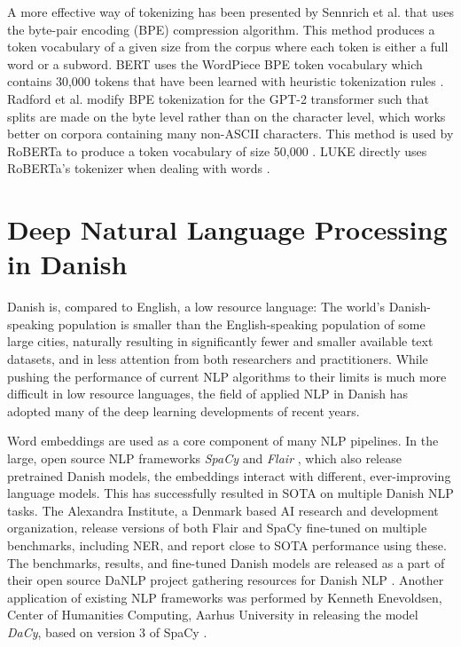 \documentclass[main.tex]{subfiles}
\begin{document}
A more effective way of tokenizing has been presented by Sennrich et al. \cite{sennrich-etal-2016-neural} that uses the byte-pair encoding (BPE) compression algorithm.
This method produces a token vocabulary of a given size from the corpus where each token is either a full word or a subword.
BERT uses the WordPiece BPE token vocabulary which contains 30,000 tokens that have been learned with heuristic tokenization rules \cite{wu2016tokenize, devlin2019bert}.
Radford et al. \cite{Radford2019gpt2} modify BPE tokenization for the GPT-2 transformer such that splits are made on the byte level rather than on the character level, which works better on corpora containing many non-ASCII characters.
This method is used by RoBERTa to produce a token vocabulary of size 50,000 \cite{liu2019roberta}.
LUKE directly uses RoBERTa's tokenizer when dealing with words \cite{yamada2020luke}.

\section{Deep Natural Language Processing in Danish}
\label{sec:nlpda}
Danish is, compared to English, a low resource language:
The world's Danish-speaking population is smaller than the English-speaking population of some large cities, naturally resulting in significantly fewer and smaller available text datasets, and in less attention from both researchers and practitioners.
While pushing the performance of current NLP algorithms to their limits is much more difficult in low resource languages, the field of applied NLP in Danish has adopted many of the deep learning developments of recent years.

Word embeddings are used as a core component of many NLP pipelines.
In the large, open source NLP frameworks \emph{SpaCy} \cite{honnibal2020spacy} and \emph{Flair} \cite{akbik2019flair}, which also release pretrained Danish models, the embeddings interact with different, ever-improving language models.
This has successfully resulted in SOTA on multiple Danish NLP tasks.
The Alexandra Institute, a Denmark based AI research and development organization, release versions of both Flair and SpaCy fine-tuned on multiple benchmarks, including NER, and report close to SOTA performance using these.
The benchmarks, results, and fine-tuned Danish models are released as a part of their open source DaNLP project gathering resources for Danish NLP \cite{danlp2021}.
Another application of existing NLP frameworks was performed by Kenneth Enevoldsen, Center of Humanities Computing, Aarhus University in releasing the model \emph{DaCy}, based on version 3 of SpaCy \cite{enevoldsen2020dacy}.
\end{document}

